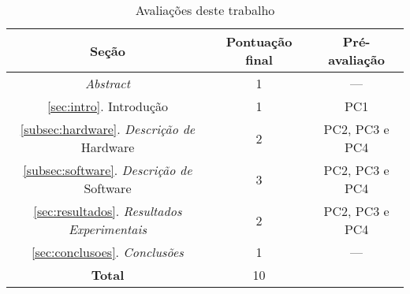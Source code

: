 \begin{table}[!htpb]
\renewcommand{\arraystretch}{1.3}
\caption{Avaliações deste trabalho}
\label{tab:pontuacao}
\centering
\begin{tabular}{ccc}
\hline
\textbf{Seção} & \textbf{Pontuação final} & \textbf{Pré-avaliação} \\
\hline 
\textit{Abstract} & 1 & ---\\
\ref{sec:intro}. Introdução & 1 & PC1 \\
\ref{subsec:hardware}. \textit{Descrição de} Hardware & 2 & PC2, PC3 e PC4\\
\ref{subsec:software}. \textit{Descrição de} Software & 3 & PC2, PC3 e PC4\\
\ref{sec:resultados}. \textit{Resultados Experimentais} & 2 & PC2, PC3 e PC4 \\
\ref{sec:conclusoes}. \textit{Conclusões} & 1 & --- \\
\hline
\textbf{Total} & 10 \\
\hline
\end{tabular}
\end{table}